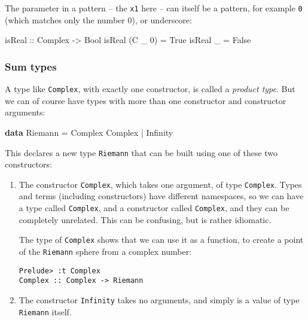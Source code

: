 \documentclass[11pt,
  american,
  DIV13]{article}
\newenvironment{Shaded}{}{}
\newcommand{\DataTypeTok}[1]{\textcolor[rgb]{0.56,0.13,0.00}{#1}}
\newcommand{\DecValTok}[1]{\textcolor[rgb]{0.25,0.63,0.44}{#1}}
\newcommand{\KeywordTok}[1]{\textcolor[rgb]{0.00,0.44,0.13}{\textbf{#1}}}
\newcommand{\NormalTok}[1]{#1}
\newcommand{\OperatorTok}[1]{\textcolor[rgb]{0.40,0.40,0.40}{#1}}
\newcommand{\OtherTok}[1]{\textcolor[rgb]{0.00,0.44,0.13}{#1}}
\begin{document}
The parameter in a pattern -- the \texttt{x1} here -- can itself be a
pattern, for example \texttt{0} (which matches only the number 0), or
underscore:

\begin{Shaded}
\begin{Highlighting}[]
\OtherTok{isReal ::} \DataTypeTok{Complex} \OtherTok{{-}\textgreater{}} \DataTypeTok{Bool}
\NormalTok{isReal (}\DataTypeTok{C}\NormalTok{ \_ }\DecValTok{0}\NormalTok{) }\OtherTok{=} \DataTypeTok{True}
\NormalTok{isReal \_ }\OtherTok{=} \DataTypeTok{False}
\end{Highlighting}
\end{Shaded}

\hypertarget{sum-types}{%
\subsubsection{Sum types}\label{sum-types}}

A type like \texttt{Complex}, with exactly one constructor, is called a
\emph{product type}. But we can of course have types with more than one
constructor and constructor arguments:

\begin{Shaded}
\begin{Highlighting}[]
\KeywordTok{data} \DataTypeTok{Riemann} \OtherTok{=} \DataTypeTok{Complex} \DataTypeTok{Complex} \OperatorTok{|} \DataTypeTok{Infinity}
\end{Highlighting}
\end{Shaded}

This declares a new type \texttt{Riemann} that can be built using one of
these two constructors:

\begin{enumerate}
\def\labelenumi{\arabic{enumi}.}
\item
  The constructor \texttt{Complex}, which takes one argument, of type
  \texttt{Complex}. Types and terms (including constructors) have
  different namespaces, so we can have a type called \texttt{Complex},
  and a constructor called \texttt{Complex}, and they can be completely
  unrelated. This can be confusing, but is rather idiomatic.

  The type of \texttt{Complex} shows that we can use it as a function,
  to create a point of the \texttt{Riemann} sphere from a complex
  number:

\begin{verbatim}
Prelude> :t Complex
Complex :: Complex -> Riemann
\end{verbatim}
\item
  The constructor \texttt{Infinity} takes no arguments, and simply is a
  value of type \texttt{Riemann} itself.
\end{enumerate}
\end{document}
